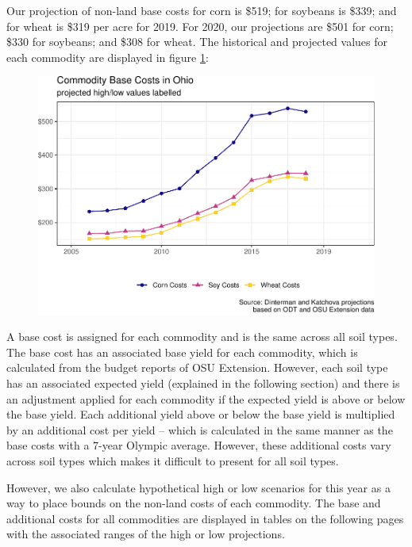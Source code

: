 \documentclass[]{article}
\begin{document}
Our projection of non-land base costs for corn is \$519; for soybeans is
\$339; and for wheat is \$319 per acre for 2019. For 2020, our
projections are \$501 for corn; \$330 for soybeans; and \$308 for wheat.
The historical and projected values for each commodity are displayed in
figure \ref{fig:viz-nonland}:

\begin{figure}[H]
\includegraphics[width=1\linewidth]{4-projections-2019-2020_files/figure-latex/viz-nonland-1} \caption{\label{fig:viz-nonland}}\label{fig:viz-nonland}
\end{figure}

A base cost is assigned for each commodity and is the same across all
soil types. The base cost has an associated base yield for each
commodity, which is calculated from the budget reports of OSU Extension.
However, each soil type has an associated expected yield (explained in
the following section) and there is an adjustment applied for each
commodity if the expected yield is above or below the base yield. Each
additional yield above or below the base yield is multiplied by an
additional cost per yield -- which is calculated in the same manner as
the base costs with a 7-year Olympic average. However, these additional
costs vary across soil types which makes it difficult to present for all
soil types.

However, we also calculate hypothetical high or low scenarios for this
year as a way to place bounds on the non-land costs of each commodity.
The base and additional costs for all commodities are displayed in
tables on the following pages with the associated ranges of the high or
low projections.
\end{document}
